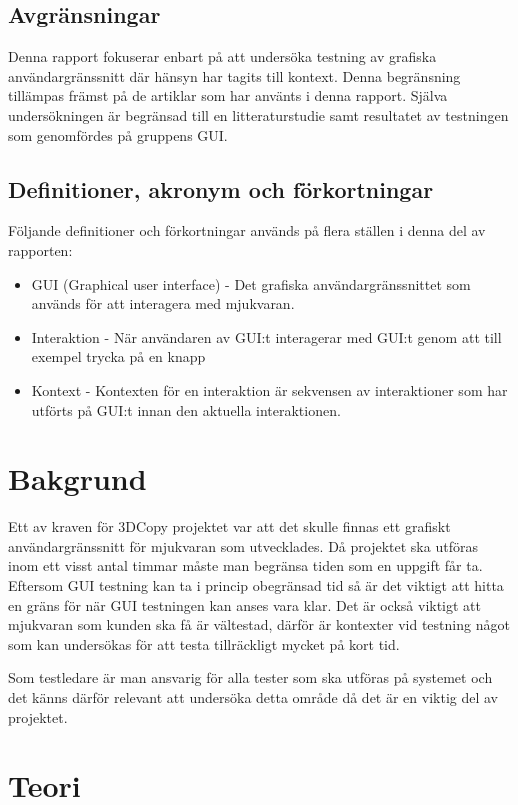 \subsection{Avgränsningar}

Denna rapport fokuserar enbart på att undersöka testning av grafiska användargränssnitt där hänsyn har tagits till kontext. Denna begränsning tillämpas främst på de artiklar som har använts i denna rapport. Själva undersökningen är begränsad till en litteraturstudie samt resultatet av testningen som genomfördes på gruppens GUI.

\subsection{Definitioner, akronym och förkortningar}
Följande definitioner och förkortningar används på flera ställen i denna del av rapporten:
\begin{itemize}
	\item GUI (Graphical user interface) - Det grafiska användargränssnittet som används för att interagera med mjukvaran.
	\item Interaktion - När användaren av GUI:t interagerar med GUI:t genom att till exempel trycka på en knapp
	\item Kontext - Kontexten för en interaktion är sekvensen av interaktioner som har utförts på GUI:t innan den aktuella interaktionen.
\end{itemize}

\section{Bakgrund}
\label{sec:background-holmberg}

Ett av kraven för 3DCopy projektet var att det skulle finnas ett grafiskt användargränssnitt för mjukvaran som utvecklades. Då projektet ska utföras inom ett visst antal timmar måste man begränsa tiden som en uppgift får ta. Eftersom GUI testning kan ta i princip obegränsad tid så är det viktigt att hitta en gräns för när GUI testningen kan anses vara klar. Det är också viktigt att mjukvaran som kunden ska få är vältestad, därför är kontexter vid testning något som kan undersökas för att testa tillräckligt mycket på kort tid.

Som testledare är man ansvarig för alla tester som ska utföras på systemet och det känns därför relevant att undersöka detta område då det är en viktig del av projektet.

\section{Teori}
\label{sec:theory-holmberg}

